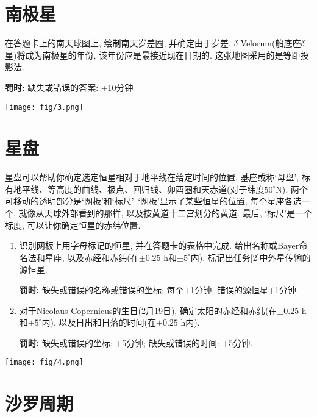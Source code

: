 \documentclass[a4paper,fontset=fandol]{ctexart}
\begin{document}
	\newpage
	\section{南极星}
	
	在答题卡上的南天球图上, 绘制南天岁差圈, 并确定由于岁差, $\delta$ Velorum(船底座$\delta$星)将成为南极星的年份, 该年份应是最接近现在日期的. 这张地图采用的是等距投影法.
	
	\textbf{罚时: }缺失或错误的答案: +10分钟
	
	\begin{center}
		\texttt{[image: fig/3.png]}
	\end{center}
	
	\newpage
	\section{星盘}
	
	星盘可以帮助你确定选定恒星相对于地平线在给定时间的位置. 基座或称`母盘', 标有地平线、等高度的曲线、极点、回归线、卯酉圈和天赤道(对于纬度$50^\circ\text{N}$). 两个可移动的透明部分是`网板'和`标尺'. `网板'显示了某些恒星的位置, 每个星座各选一个, 就像从天球外部看到的那样, 以及按黄道十二宫划分的黄道. 最后, `标尺'是一个标度, 可以让你确定恒星的赤纬位置. 
	
	\begin{enumerate}[label*=(\alph*)]
		\item 识别网板上用字母标记的恒星, 并在答题卡的表格中完成. 给出名称或Bayer命名法和星座, 以及赤经和赤纬(在$\pm0.25\text{ h}$和$\pm5^\circ$内). 标记出任务\ref{2}中外星传输的源恒星. 
		
		\textbf{罚时: }缺失或错误的名称或错误的坐标: 每个+1分钟; 错误的源恒星+1分钟. 
		
		\item 对于Nicolaus Copernicus的生日(2月19日), 确定太阳的赤经和赤纬(在$\pm0.25\text{ h}$和$\pm5^\circ$内), 以及日出和日落的时间(在$\pm0.25\text{ h}$内). 
		
		\textbf{罚时: }缺失或错误的坐标: +5分钟; 缺失或错误的时间: +5分钟. 
	\end{enumerate}
	
	\begin{center}
		\texttt{[image: fig/4.png]}
	\end{center}
	
	\newpage
	\section{沙罗周期}
	
\end{document}
